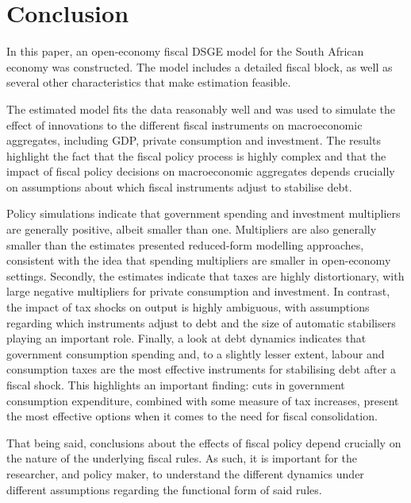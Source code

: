 \documentclass[a4paper,11pt]{article}
\numberwithin{equation}{section}
\begin{document}
	
	
	\section{Conclusion} \label{con_dsge}
	
	In this paper, an open-economy fiscal DSGE model for the South African economy was constructed. The model includes a detailed fiscal block, as well as several other characteristics that make estimation feasible. 
	
	The estimated model fits the data reasonably well and was used to simulate the effect of innovations to the different fiscal instruments on macroeconomic aggregates, including GDP, private consumption and investment. The results highlight the fact that the fiscal policy process is highly complex and that the impact of fiscal policy decisions on macroeconomic aggregates depends crucially on assumptions about which fiscal instruments adjust to stabilise debt. 
	
	Policy simulations indicate that government spending and investment multipliers are generally positive, albeit smaller than one. Multipliers are also generally smaller than the estimates presented reduced-form modelling approaches, consistent with the idea that spending multipliers are smaller in open-economy settings. Secondly, the estimates indicate that taxes are highly distortionary, with large negative multipliers for private consumption and investment. In contrast, the impact of tax shocks on output is highly ambiguous, with assumptions regarding which instruments adjust to debt and the size of automatic stabilisers playing an important role. Finally, a look at debt dynamics indicates that government consumption spending and, to a slightly lesser extent, labour and consumption taxes are the most effective instruments for stabilising debt after a fiscal shock. This highlights an important finding: cuts in government consumption expenditure, combined with some measure of tax increases, present the most effective options when it comes to the need for fiscal consolidation. 
	
	That being said, conclusions about the effects of fiscal policy depend crucially on the nature of the underlying fiscal rules. As such, it is important for the researcher, and policy maker, to understand the different dynamics under different assumptions regarding the functional form of said rules.  
	
\end{document}
